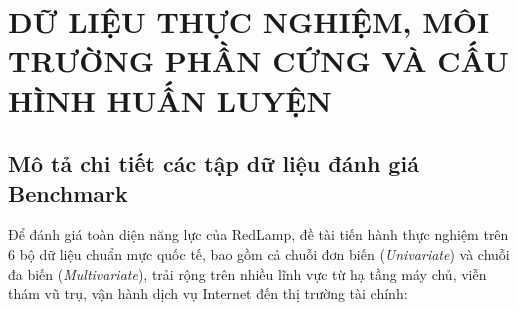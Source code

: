 \documentclass[11pt,journal,onecolumn]{IEEEtran}
\begin{document}
\section{DỮ LIỆU THỰC NGHIỆM, MÔI TRƯỜNG PHẦN CỨNG VÀ CẤU HÌNH HUẤN LUYỆN}
\label{sec:chapter4}

\subsection{Mô tả chi tiết các tập dữ liệu đánh giá Benchmark}
Để đánh giá toàn diện năng lực của RedLamp, đề tài tiến hành thực nghiệm trên 6 bộ dữ liệu chuẩn mực quốc tế, bao gồm cả chuỗi đơn biến (\textit{Univariate}) và chuỗi đa biến (\textit{Multivariate}), trải rộng trên nhiều lĩnh vực từ hạ tầng máy chủ, viễn thám vũ trụ, vận hành dịch vụ Internet đến thị trường tài chính:
\end{document}
